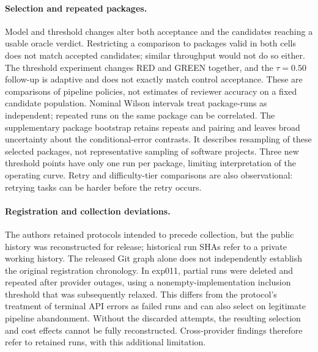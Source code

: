 \paragraph{Selection and repeated packages.} Model and threshold changes alter both acceptance
and the candidates reaching a usable oracle verdict. Restricting a comparison to packages valid
in both cells does not match accepted candidates; similar throughput would not do so either.
The threshold experiment changes RED and GREEN together, and the $\tau{=}0.50$ follow-up is
adaptive and does not exactly match control acceptance. These are comparisons of pipeline
policies, not estimates of reviewer accuracy on a fixed candidate population. Nominal Wilson
intervals treat package-runs as independent; repeated runs on the same package can be correlated.
The supplementary package bootstrap retains repeats and pairing and leaves broad uncertainty
about the conditional-error contrasts. It describes resampling of these selected packages,
not representative sampling of software projects. Three new threshold points have only one
run per package, limiting interpretation of the operating curve. Retry and difficulty-tier
comparisons are also observational: retrying tasks can be harder before the retry occurs.

\paragraph{Registration and collection deviations.} The authors retained protocols intended to
precede collection, but the public history was reconstructed for release; historical run SHAs
refer to a private working history. The released Git graph alone does not independently establish
the original registration chronology. In exp011, partial runs were deleted and repeated after
provider outages, using a nonempty-implementation inclusion threshold that was subsequently
relaxed. This differs from the protocol's treatment of terminal API errors as failed runs and can
also select on legitimate pipeline abandonment. Without the discarded attempts, the resulting
selection and cost effects cannot be fully reconstructed. Cross-provider findings therefore
refer to retained runs, with this additional limitation.


